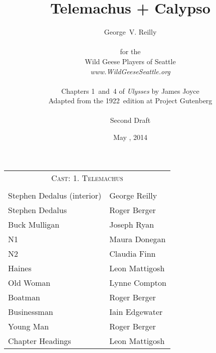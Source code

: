 



\title{\Huge Telemachus + Calypso}
\author{George~V. Reilly\\
\\
{\small for the}\\
Wild Geese Players of Seattle\\
{\emph{www.WildGeeseSeattle.org}}\\
\\
{\small Chapters 1~and~4 of \emph{Ulysses} by James Joyce}\\
{\small Adapted from the 1922~edition at Project Gutenberg}
\\
\\
{\small Second Draft}}
\date{May , 2014}
\raggedbottom



\maketitle
\thispagestyle{empty}
\pagebreak

\begin{tabular}{lp{10cm}}
    \multicolumn{2}{c}{\Large \textsc{Cast: 1. Telemachus}} \\
\\
Stephen Dedalus (interior) & George Reilly \\
Stephen Dedalus  &  Roger Berger\\
Buck Mulligan & Joseph Ryan \\
N1 & Maura Donegan \\
N2 & Claudia Finn \\
Haines & Leon Mattigosh \\
Old Woman & Lynne Compton \\
Boatman & Roger Berger \\
Businessman & Iain Edgewater \\
Young Man & Roger Berger \\
Chapter Headings & Leon Mattigosh \\
\end{tabular}

\bigskip
\bigskip
\bigskip

